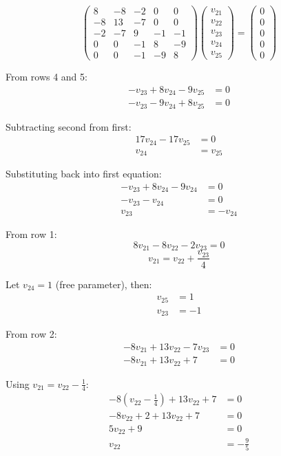 \documentclass[12pt]{article}
\begin{document}
\begin{solution}
\[
\begin{pmatrix}
8 & -8 & -2 & 0 & 0 \\
-8 & 13 & -7 & 0 & 0 \\
-2 & -7 & 9 & -1 & -1 \\
0 & 0 & -1 & 8 & -9 \\
0 & 0 & -1 & -9 & 8
\end{pmatrix} \begin{pmatrix} v_{21} \\ v_{22} \\ v_{23} \\ v_{24} \\ v_{25} \end{pmatrix} = \begin{pmatrix} 0 \\ 0 \\ 0 \\ 0 \\ 0 \end{pmatrix}
\]

From rows 4 and 5:
\begin{align*}
-v_{23} + 8v_{24} - 9v_{25} &= 0 \\
-v_{23} - 9v_{24} + 8v_{25} &= 0
\end{align*}

Subtracting second from first:
\begin{align*}
17v_{24} - 17v_{25} &= 0 \\
v_{24} &= v_{25}
\end{align*}

Substituting back into first equation:
\begin{align*}
-v_{23} + 8v_{24} - 9v_{24} &= 0 \\
-v_{23} - v_{24} &= 0 \\
v_{23} &= -v_{24}
\end{align*}

From row 1:
\[
8v_{21} - 8v_{22} - 2v_{23} = 0
\]
\[
v_{21} = v_{22} + \frac{v_{23}}{4}
\]

Let $v_{24} = 1$ (free parameter), then:
\begin{align*}
v_{25} &= 1 \\
v_{23} &= -1
\end{align*}

From row 2:
\begin{align*}
-8v_{21} + 13v_{22} - 7v_{23} &= 0 \\
-8v_{21} + 13v_{22} + 7 &= 0
\end{align*}

Using $v_{21} = v_{22} - \frac{1}{4}$:
\begin{align*}
-8(v_{22} - \frac{1}{4}) + 13v_{22} + 7 &= 0 \\
-8v_{22} + 2 + 13v_{22} + 7 &= 0 \\
5v_{22} + 9 &= 0 \\
v_{22} &= -\frac{9}{5}
\end{align*}


\end{solution}
\end{document}
